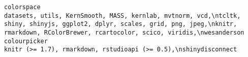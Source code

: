 \documentclass[
  letterpaper,
  DIV=11,
  numbers=noendperiod]{scrreprt}
\begin{document}
\begin{verbatim}
colorspace                                                                                                                                                                                                                                                                                                                                                                                                                                                                                                                                                                                                                                                                                                                                                                                                                                                                                                                                                                                                                                                                                              datasets, utils, KernSmooth, MASS, kernlab, mvtnorm, vcd,\ntcltk, shiny, shinyjs, ggplot2, dplyr, scales, grid, png, jpeg,\nknitr, rmarkdown, RColorBrewer, rcartocolor, scico, viridis,\nwesanderson
colourpicker                                                                                                                                                                                                                                                                                                                                                                                                                                                                                                                                                                                                                                                                                                                                                                                                                                                                                                                                                                                                                                                                                                                                                                                                                                 knitr (>= 1.7), rmarkdown, rstudioapi (>= 0.5),\nshinydisconnect

\end{verbatim}
\end{document}
